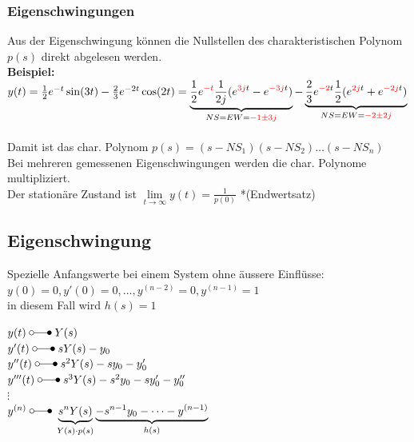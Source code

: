 		\subsubsection{Eigenschwingungen}
			Aus der Eigenschwingung können die Nullstellen des charakteristischen Polynom $p(s)$ 
			direkt abgelesen werden. \\
			\textbf{Beispiel:} \\
			$y(t) = \frac{1}{2} e^{-t} \sin(3t) - \frac{2}{3} e^{-2t} \cos(2t) = 
			\underbrace{\frac{1}{2} e^{\textcolor{red}{-t}} \frac{1}{2j}(e^{\textcolor{red}{3j}t}
			-e^{\textcolor{red}{-3j}t})}_{NS = EW = \textcolor{red}{-1 \pm 3j}} - 
			\underbrace{\frac{2}{3} e^{\textcolor{red}{-2}t} \frac{1}{2}(e^{\textcolor{red}{2j}t}
			+e^{\textcolor{red}{-2j}t})}_{NS = EW = \textcolor{red}{-2 \pm 2j}}$ \\\\
			Damit ist das char. Polynom $p(s) = (s-NS_1)(s-NS_2)\ldots(s-NS_n)$ \\
			Bei mehreren gemessenen Eigenschwingungen werden die char. Polynome multipliziert. \\
			Der stationäre Zustand ist $\lim\limits_{t\rightarrow\infty}y(t) = \frac{1}{p(0)}$ *(Endwertsatz) \\
				
		
	\subsection{Eigenschwingung}
		\begin{minipage}{12cm}
			Spezielle Anfangswerte bei einem System ohne äussere Einflüsse:\\
			$y(0) = 0, y'(0) = 0, \dots , y^{(n-2)} = 0, y^{(n-1)} = 1$\\
			in diesem Fall wird $h(s) = 1$\\
		\end{minipage}
		\begin{minipage}{6cm}
			$y(t) \; \laplace \; Y(s)$\\
			$y'(t) \; \laplace \; sY(s) - y_0$\\
			$y''(t)\; \laplace \; s^2Y(s) - sy_0 - y'_0$\\ 
			$y'''(t)\; \laplace \; s^3Y(s) - s^2y_0 - sy'_0 - y''_0$\\ 
			$\vdots$\\
			$y^{(n)} \; \laplace \; 
			\underbrace{s^nY(s)}_{Y(s) \cdot p(s)}
			\underbrace{-s^{n-1}y_0 - \dots - y^{(n-1)}}_{h(s)}$
		\end{minipage}